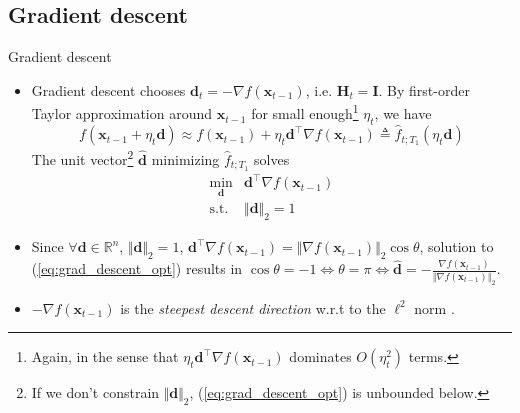 \documentclass{beamer}
\numberwithin{equation}{section}
\newcommand{\aref}[1]{\alert{\ref{#1}}}
\begin{document}
\subsection{Gradient descent}

\begin{frame}{Gradient descent}
    \begin{itemize}
        \item
        Gradient descent chooses $ \mathbf{d}_t =
        -\nabla f(\mathbf{x}_{t - 1}) $, i.e. $ \mathbf{H}_t = \mathbf{I} $.
        By first-order Taylor approximation around $ \mathbf{x}_{t - 1} $ for
        small enough\footnote{
            Again, in the sense that $ \eta_t\mathbf{d}^\top
            \nabla f(\mathbf{x}_{t - 1}) $ dominates $ O(\eta_t^2) $ terms.
        } $ \eta_t $, we have
        \begin{equation*}
            f(\mathbf{x}_{t - 1} + \eta_t\mathbf{d}) \approx
            f(\mathbf{x}_{t - 1}) + \eta_t\mathbf{d}^\top
            \nabla f(\mathbf{x}_{t - 1}) \triangleq
            \hat{f}_{t; T_1}(\eta_t\mathbf{d})
        \end{equation*}
        The unit vector\footnote{
            If we don't constrain $ \Vert\mathbf{d}\Vert_2 $,
            (\aref{eq:grad_descent_opt}) is unbounded below.
        } $ \hat{\mathbf{d}} $ minimizing $ \hat{f}_{t; T_1} $ solves
        \cite{nocedal_opt}
        \begin{equation} \label{eq:grad_descent_opt}
            \begin{array}{ll}
                \displaystyle\min_{\mathbf{d}} &
                    \mathbf{d}^\top\nabla f(\mathbf{x}_{t - 1}) \\
                \text{s.t.} & \Vert\mathbf{d}\Vert_2 = 1
            \end{array}
        \end{equation}

        \item
        Since $ \forall \mathbf{d} \in \mathbb{R}^n $,
        $ \Vert\mathbf{d}\Vert_2 = 1 $, $ \mathbf{d}^\top
        \nabla f(\mathbf{x}_{t - 1}) = \Vert\nabla f(\mathbf{x}_{t - 1})\Vert_2
        \cos\theta $, solution to (\aref{eq:grad_descent_opt}) results in
        $ \cos\theta = -1 \Leftrightarrow \theta = \pi \Leftrightarrow
        \hat{\mathbf{d}} = -\frac{
            \nabla f(\mathbf{x}_{t - 1})
        }{\Vert\nabla f(\mathbf{x}_{t - 1})\Vert_2} $.

        \item
        $ -\nabla f(\mathbf{x}_{t - 1}) $ is the
        \textit{steepest descent direction} w.r.t to the $ \ell^2 $ norm
        \cite{bv_convex_opt}.
    \end{itemize}

    \bigskip
\end{frame}
\end{document}
